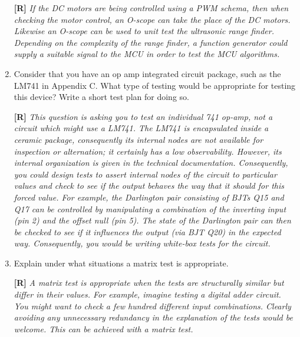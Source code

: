 \begin{enumerate}
  \begin{onlysolution}
    \textbf{[R]}
    \itshape
    If the DC motors are being controlled using a PWM schema, then when checking the motor control, an O-scope can take 
    the place of the DC motors. Likewise an O-scope can be used to unit test the ultrasonic range finder. Depending on 
    the complexity of the range finder, a function generator could supply a suitable signal to the MCU in order to test 
    the MCU algorithms.
  \end{onlysolution}

\item
  Consider that you have an op amp integrated circuit package, such as
  the LM741 in Appendix C. What type of testing would be appropriate for
  testing this device? Write a short test plan for doing so.

  \begin{onlysolution}
    \textbf{[R]}
    \itshape
    This question is asking you to test an individual 741 op-amp, not a circuit which might use a LM741. The LM741 is 
    encapsulated inside a ceramic package, consequently its internal nodes are not available for inspection or alternation; 
    it certainly has a low observability. However, its internal organization is given in the technical documentation. 
    Consequently, you could design tests to assert internal nodes of the circuit to particular values and check to see if 
    the output behaves the way that it should for this forced value. For example, the Darlington pair consisting of BJTs Q15 
    and Q17 can be controlled by manipulating a combination of the inverting input (pin 2) and the offset null (pin 5). The 
    state of the Darlington pair can then be checked to see if it influences the output (via BJT Q20) in the expected way. 
    Consequently, you would be writing white-box tests for the circuit.

  \end{onlysolution}

\item
  Explain under what situations a matrix test is appropriate.

  \begin{onlysolution}
    \textbf{[R]}
    \itshape
    A matrix test is appropriate when the tests are structurally similar but differ in their values. For example, imagine 
    testing a digital adder circuit. You might want to check a few hundred different input combinations. Clearly avoiding 
    any unnecessary redundancy in the explanation of the tests would be welcome. This can be achieved with a matrix test.
  \end{onlysolution}
  

\end{enumerate}
